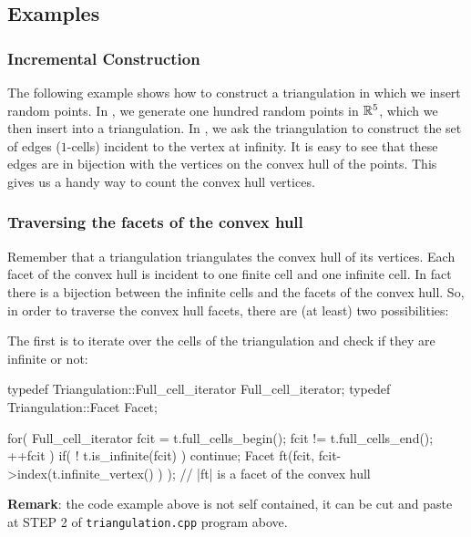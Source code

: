 
\subsection{Examples}

\subsubsection{Incremental Construction}

The following example shows how to construct a triangulation in which we insert
random points. In , we generate one hundred random points in
$\mathbb R^5$, which we then insert into a triangulation. In , we 
ask the triangulation to construct the set of edges
($1$-cells) incident to the vertex at infinity. It is easy to see that
these edges are in bijection with the vertices on the convex hull of the
points. This gives us a handy way to count the convex hull vertices. 


\subsubsection{Traversing the facets of the convex hull}

Remember that a triangulation triangulates the convex hull of its vertices. Each
facet of the convex hull is incident to one finite cell and one infinite
cell. In fact there is a bijection between the infinite cells and the
facets of the convex hull. So, in order to traverse the convex hull facets,
there are (at least) two possibilities:

The first is to iterate over the cells of the triangulation and check if they
are infinite or not:

\begin{ccExampleCode}
typedef Triangulation::Full_cell_iterator Full_cell_iterator;
typedef Triangulation::Facet Facet;

for( Full_cell_iterator fcit = t.full_cells_begin(); 
      fcit != t.full_cells_end(); ++fcit ) {
    if( ! t.is_infinite(fcit) )
        continue;
    Facet ft(fcit, fcit->index(t.infinite_vertex() ) ); 
    // |ft| is a facet of the convex hull
}
\end{ccExampleCode}%
\textbf{Remark}: the code example above is not self contained, it can
be cut and paste at STEP 2 of {\tt triangulation.cpp} program above.

